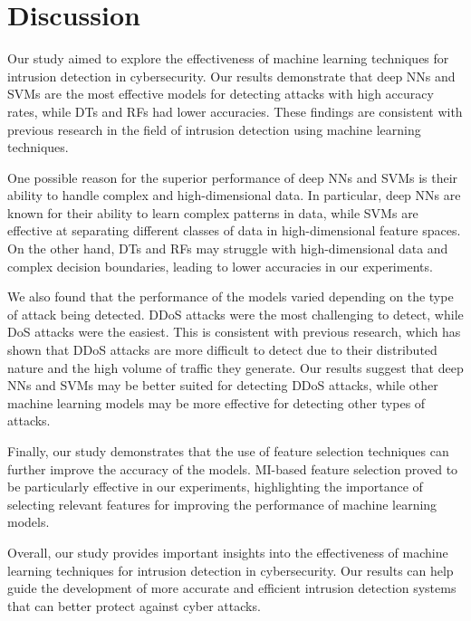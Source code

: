 \chapter{Discussion}  

Our study aimed to explore the effectiveness of machine learning techniques for intrusion detection in cybersecurity. Our results demonstrate that deep \acp{NN} and \acp{SVM} are the most effective models for detecting attacks with high accuracy rates, while \acp{DT} and \acp{RF} had lower accuracies. These findings are consistent with previous research in the field of intrusion detection using machine learning techniques.

One possible reason for the superior performance of deep \acp{NN} and \acp{SVM} is their ability to handle complex and high-dimensional data. In particular, deep \acp{NN} are known for their ability to learn complex patterns in data, while \acp{SVM} are effective at separating different classes of data in high-dimensional feature spaces. On the other hand, \acp{DT} and \acp{RF} may struggle with high-dimensional data and complex decision boundaries, leading to lower accuracies in our experiments.

We also found that the performance of the models varied depending on the type of attack being detected. \ac{DDoS} attacks were the most challenging to detect, while \ac{DoS} attacks were the easiest. This is consistent with previous research, which has shown that \ac{DDoS} attacks are more difficult to detect due to their distributed nature and the high volume of traffic they generate. Our results suggest that deep \acp{NN} and \acp{SVM} may be better suited for detecting \ac{DDoS} attacks, while other machine learning models may be more effective for detecting other types of attacks.

Finally, our study demonstrates that the use of feature selection techniques can further improve the accuracy of the models. \Ac{MI}-based feature selection proved to be particularly effective in our experiments, highlighting the importance of selecting relevant features for improving the performance of machine learning models.

Overall, our study provides important insights into the effectiveness of machine learning techniques for intrusion detection in cybersecurity. Our results can help guide the development of more accurate and efficient intrusion detection systems that can better protect against cyber attacks.
